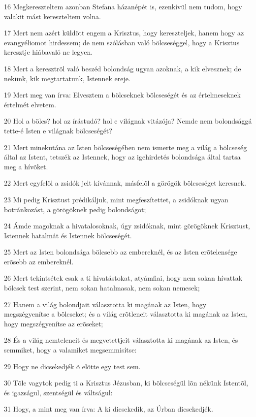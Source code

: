 \par 16 Megkereszteltem azonban Stefana házanépét is, ezenkívül nem tudom, hogy valakit mást kereszteltem volna.
\par 17 Mert nem azért küldött engem a Krisztus, hogy kereszteljek, hanem hogy az evangyéliomot hirdessem; de nem szólásban való bölcseséggel, hogy a Krisztus keresztje hiábavaló ne legyen.
\par 18 Mert a keresztrõl való beszéd bolondság ugyan azoknak, a kik elvesznek; de nekünk,  kik megtartatunk, Istennek ereje.
\par 19 Mert meg van írva: Elvesztem a bölcseknek bölcseségét és az értelmeseknek értelmét elvetem.
\par 20 Hol a bölcs?  hol az írástudó? hol e világnak vitázója? Nemde nem bolondsággá tette-é Isten e világnak bölcseségét?
\par 21 Mert minekutána az Isten bölcseségében nem ismerte meg a világ a bölcseség által az Istent, tetszék az Istennek, hogy az igehirdetés bolondsága által tartsa meg a hívõket.
\par 22 Mert egyfelõl a zsidók jelt kívánnak, másfelõl a görögök bölcseséget keresnek.
\par 23 Mi pedig Krisztust prédikáljuk, mint megfeszítettet, a zsidóknak ugyan botránkozást,  a görögöknek pedig bolondságot;
\par 24 Ámde magoknak a hivatalosoknak, úgy zsidóknak, mint görögöknek Krisztust, Istennek hatalmát és Istennek  bölcseségét.
\par 25 Mert az Isten bolondsága bölcsebb az embereknél, és az Isten erõtelensége erõsebb az embereknél.
\par 26 Mert tekintsétek csak a ti hivatástokat, atyámfiai, hogy nem sokan hívattak bölcsek test szerint, nem sokan hatalmasak, nem sokan nemesek;
\par 27 Hanem a világ bolondjait választotta ki magának az Isten, hogy megszégyenítse a bölcseket; és a világ erõtleneit választotta ki magának az Isten, hogy megszégyenítse az erõseket;
\par 28 És a világ nemteleneit és megvetettjeit választotta ki magának az Isten, és semmiket, hogy a valamiket megsemmisítse:
\par 29 Hogy ne dicsekedjék õ elõtte egy test sem.
\par 30 Tõle vagytok pedig ti a Krisztus Jézusban, ki bölcseségül lõn nékünk Istentõl, és igazságul, szentségül  és váltságul:
\par 31 Hogy, a mint meg van írva: A ki dicsekedik, az Úrban dicsekedjék.

